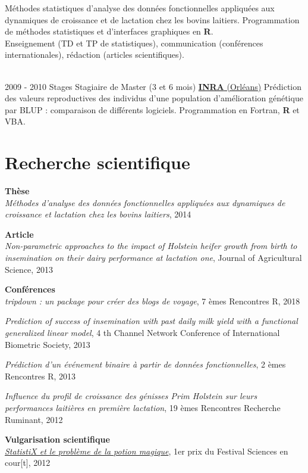 \documentclass[letterpaper]{twentysecondcv} %
\begin{document}
\begin{twenty}
{        Méthodes statistiques d’analyse des données fonctionnelles appliquées aux dynamiques de croissance et de lactation chez les bovins laitiers. Programmation de méthodes statistiques et d’interfaces graphiques en \textbf{R}. \\
        Enseignement (TD et TP de statistiques), communication (conférences internationales), rédaction (articles scientifiques).
    
        }
     \\
     \twentyitem
   		{2009 - 2010}
		{Stages}
        {Stagiaire de Master \textnormal{(3 et 6 mois)}}
        {\href{https://www6.val-de-loire.inra.fr/biofora}{\textbf{INRA} (Orléans)}}
        {}
        {Prédiction des valeurs reproductives des individus d’une population d’amélioration génétique par BLUP : comparaison de différents logiciels. Programmation en Fortran, \textbf{R} et VBA.
    	}
        
\end{twenty}

\section{Recherche scientifique}
\textbf{Thèse} \\ 
\textit{Méthodes d'analyse des données fonctionnelles appliquées aux dynamiques de croissance et lactation chez les bovins laitiers}, 2014

\textbf{Article} \\ 
\textit{Non-parametric approaches to the impact of Holstein heifer growth from birth to insemination on their dairy performance at lactation one}, Journal of Agricultural Science,  2013 

\textbf{Conférences} \\ 
\textit{tripdown : un package pour créer des blogs de voyage}, 7 èmes Rencontres R, 2018

\textit{Prediction of success of insemination with past daily milk yield with a functional generalized linear model}, 4 th Channel Network Conference of International Biometric Society, 2013

\textit{Prédiction d'un événement binaire à partir de données fonctionnelles}, 2 èmes Rencontres R, 2013

\textit{Influence du profil de croissance des génisses Prim Holstein sur leurs performances laitières en première
lactation}, 19 èmes Rencontres Recherche Ruminant, 2012 

\textbf{Vulgarisation scientifique}\\
\href{https://www.youtube.com/watch?v=QAT0F__A258}{\textit{StatistiX et le problème de la potion magique}}, 1er prix du Festival Sciences en cour[t], 2012
\end{document}
